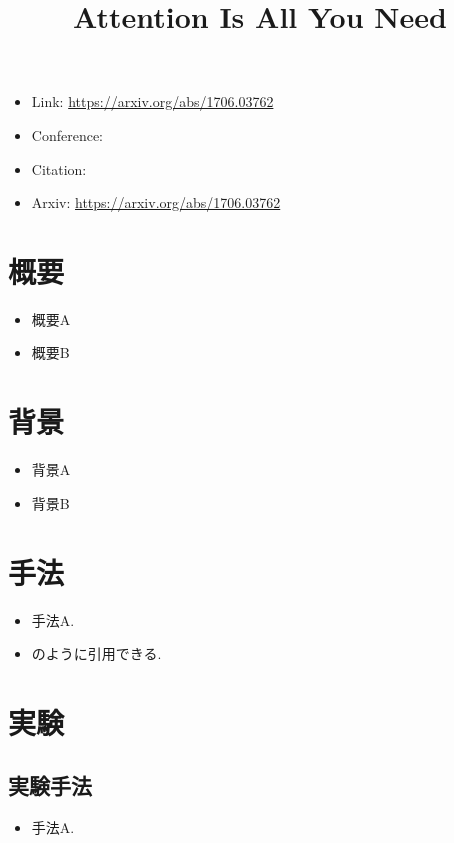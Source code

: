 \documentclass[dvipdfmx,uplatex]{jsarticle}
\title{Attention Is All You Need}
\author{\empty}
\date{\empty}
\theoremstyle{remark}
\begin{document}
\maketitle

\begin{itemize}
    \item Link: \url{https://arxiv.org/abs/1706.03762}
    \item Conference: 
    \item Citation: \cite{attention_is_all_you_need}
    \item Arxiv: \url{https://arxiv.org/abs/1706.03762}
\end{itemize}

\section{概要}
\begin{itemize}
  \item 概要A
  \item 概要B 
\end{itemize}

\section{背景}
\begin{itemize}
    \item 背景A
    \item 背景B
\end{itemize}

\section{手法}
\begin{itemize}
    \item 手法A.
    \item \cite{attention_is_all_you_need}のように引用できる.
\end{itemize}

\section{実験}
\subsection{実験手法}
\begin{itemize}
  \item 手法A.
\end{itemize}
\end{document}

